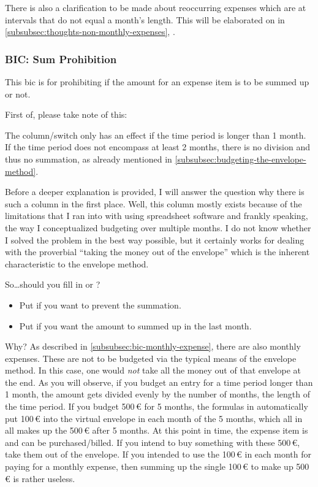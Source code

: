 There is also a clarification to be made about reoccurring expenses which are at intervals that do not equal a month's length.
This will be elaborated on in \autoref{subsubsec:thoughts-non-monthly-expenses}, .

\subsubsection{BIC: Sum Prohibition}
\label{subsubsec:bic-sum-prohibition}

This \ac{bic} is for prohibiting if the amount for an expense item is to be summed up or not.

First of, please take note of this:
\begin{specialnote}
	The column/switch  only has an effect if the time period is longer than 1 month.
	If the time period does not encompass at least 2 months, there is no division and thus no summation, as already mentioned in \autoref{subsubsec:budgeting-the-envelope-method}.
\end{specialnote}

Before a deeper explanation is provided, I will answer the question why there is such a column in the first place.
Well, this column mostly exists because of the limitations that I ran into with using spreadsheet software and frankly speaking, the way I conceptualized budgeting over multiple months.
I do not know whether I solved the problem in the best way possible, but it certainly works for dealing with the proverbial ``taking the money out of the envelope'' which is the inherent characteristic to the envelope method.

So\ldots should you fill in  or ?
\begin{itemize}
	\item Put  if you want to prevent the summation.
	\item Put  if you want the amount to summed up in the last month.
\end{itemize}

Why?
As described in \autoref{subsubsec:bic-monthly-expense}, there are also monthly expenses.
These are not to be budgeted via the typical means of the envelope method.
In this case, one would \emph{not} take all the money out of that envelope at the end.
As you will observe, if you budget an entry for a time period longer than 1 month, the amount gets divided evenly by the number of months, \ie the length of the time period.
If you budget 500\,€ for 5 months, the formulas in \tfn automatically put 100\,€ into the virtual envelope in each month of the 5 months, which all in all makes up the 500\,€ after 5 months.
At this point in time, the expense item is  and can be purchased/billed.
If you intend to buy something with these 500\,€, take them out of the envelope.
If you intended to use the 100\,€ in each month for paying for a monthly expense, then summing up the single 100\,€ to make up 500\,€ is rather useless.

